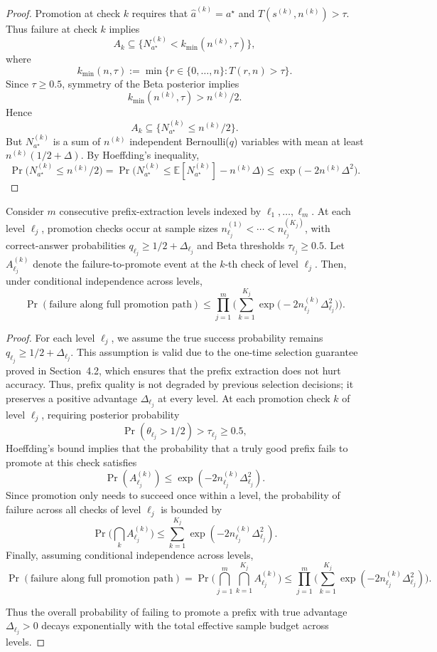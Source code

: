 \begin{proof}
Promotion at check $k$ requires that $\hat a^{(k)} = a^\star$ and $T(s^{(k)},n^{(k)})>\tau$. Thus failure at check $k$ implies
\[
A_k
\subseteq
\{ N_{a^\star}^{(k)} < k_{\min}(n^{(k)},\tau) \},
\]
where
\[
k_{\min}(n,\tau) := \min\{r \in \{0,\dots,n\}: T(r,n)>\tau\}.
\]
Since $\tau\ge 0.5$, symmetry of the Beta posterior implies
\[
k_{\min}(n^{(k)},\tau) > n^{(k)}/2.
\]
Hence
\[
A_k \subseteq \{N_{a^\star}^{(k)} \le n^{(k)}/2\}.
\]
But $N_{a^\star}^{(k)}$ is a sum of $n^{(k)}$ independent Bernoulli($q$) variables with mean at least $n^{(k)}(1/2+\Delta)$. By Hoeffding's inequality,
\[
\Pr\Big(N_{a^\star}^{(k)} \le n^{(k)}/2\Big)
=
\Pr\Big(N_{a^\star}^{(k)} \le \mathbb{E}[N_{a^\star}^{(k)}] - n^{(k)}\Delta \Big)
\le
\exp\big(-2 n^{(k)} \Delta^2\big).
\]
\end{proof}

\begin{corollary}
\label{cor:multi-level}
Consider $m$ consecutive prefix-extraction levels indexed by $\ell_1,\dots,\ell_m$. At each level $\ell_j$, promotion checks occur at sample sizes $n_{\ell_j}^{(1)} < \cdots < n_{\ell_j}^{(K_j)}$, with correct-answer probabilities $q_{\ell_j} \ge 1/2 + \Delta_{\ell_j}$ and Beta thresholds $\tau_{\ell_j} \ge 0.5$. Let $A_{\ell_j}^{(k)}$ denote the failure-to-promote event at the $k$-th check of level $\ell_j$. Then, under conditional independence across levels,
\[
\Pr(\text{failure along full promotion path})
\le
\prod_{j=1}^m
\Bigg(
\sum_{k=1}^{K_j} \exp\big(-2 n_{\ell_j}^{(k)} \Delta_{\ell_j}^2\big)
\Bigg).
\]
\end{corollary}

\begin{proof}
For each level $\ell_j$, we assume the true success probability remains $q_{\ell_j} \ge 1/2 + \Delta_{\ell_j}$. This assumption is valid due to the one-time selection guarantee proved in Section~4.2, which ensures that the prefix extraction does not hurt accuracy. Thus, prefix quality is not degraded by previous selection decisions; it preserves a positive advantage $\Delta_{\ell_j}$ at every level.
At each promotion check $k$ of level $\ell_j$, requiring posterior probability
\[
\Pr(\theta_{\ell_j} > 1/2) > \tau_{\ell_j} \ge 0.5,
\]
Hoeffding’s bound implies that the probability that a truly good prefix fails to promote at this check satisfies
\[
\Pr(A_{\ell_j}^{(k)}) \le \exp(-2n_{\ell_j}^{(k)} \Delta_{\ell_j}^2).
\]
Since promotion only needs to succeed once within a level, the probability of failure across all checks of level $\ell_j$ is bounded by
\[
\Pr\Big(\bigcap_{k} A_{\ell_j}^{(k)}\Big)
\le
\sum_{k=1}^{K_j} \exp(-2n_{\ell_j}^{(k)} \Delta_{\ell_j}^2).
\]
Finally, assuming conditional independence across levels,
\[
\Pr(\text{failure along full promotion path})
=
\Pr\Big(\bigcap_{j=1}^m \bigcap_{k=1}^{K_j} A_{\ell_j}^{(k)}\Big)
\le
\prod_{j=1}^m
\Bigg(
\sum_{k=1}^{K_j} \exp(-2 n_{\ell_j}^{(k)} \Delta_{\ell_j}^2)
\Bigg).
\]

Thus the overall probability of failing to promote a prefix with true advantage $\Delta_{\ell_j}>0$ decays exponentially with the total effective sample budget across levels.
\end{proof}

